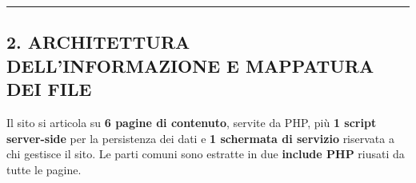 \documentclass[
  11pt,
]{article}
\begin{document}
\begin{center}\rule{0.5\linewidth}{0.5pt}\end{center}

\hypertarget{architettura-dellinformazione-e-mappatura-dei-file}{%
\subsection{2. ARCHITETTURA DELL'INFORMAZIONE E MAPPATURA DEI
FILE}\label{architettura-dellinformazione-e-mappatura-dei-file}}

Il sito si articola su \textbf{6 pagine di contenuto}, servite da PHP,
più \textbf{1 script server-side} per la persistenza dei dati e
\textbf{1 schermata di servizio} riservata a chi gestisce il sito. Le
parti comuni sono estratte in due \textbf{include PHP} riusati da tutte
le pagine.
\end{document}
